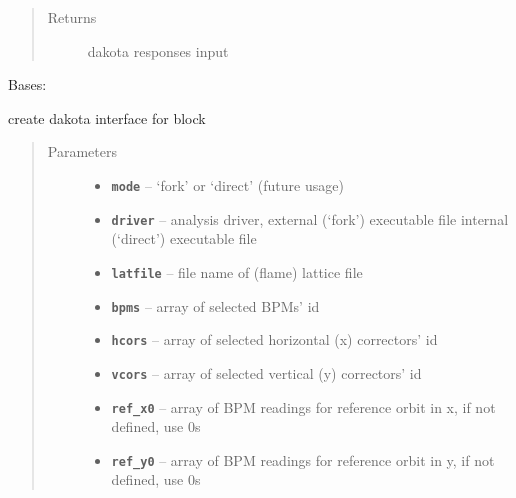 \documentclass[letterpaper,10pt,english]{sphinxmanual}
\begin{document}
\begin{fulllineitems}
\begin{fulllineitems}
\begin{quote}
\begin{description}
\item[{Returns}] \leavevmode
dakota responses input

\end{description}\end{quote}

\end{fulllineitems}


\end{fulllineitems}


\begin{fulllineitems}
\label{src/apidocs/genopt:genopt.DakotaInterface}
Bases: \href{https://docs.python.org/2/library/functions.html\#object}{}

create dakota interface for  block
\begin{quote}\begin{description}
\item[{Parameters}] \leavevmode\begin{itemize}
\item {} 
\textbf{\texttt{mode}} -- `fork' or `direct' (future usage)

\item {} 
\textbf{\texttt{driver}} -- analysis driver, external (`fork') executable file
internal (`direct') executable file

\item {} 
\textbf{\texttt{latfile}} -- file name of (flame) lattice file

\item {} 
\textbf{\texttt{bpms}} -- array of selected BPMs' id

\item {} 
\textbf{\texttt{hcors}} -- array of selected horizontal (x) correctors' id

\item {} 
\textbf{\texttt{vcors}} -- array of selected vertical (y) correctors' id

\item {} 
\textbf{\texttt{ref\_x0}} -- array of BPM readings for reference orbit in x, if not defined, use 0s

\item {} 
\textbf{\texttt{ref\_y0}} -- array of BPM readings for reference orbit in y, if not defined, use 0s


\end{itemize}
\end{description}
\end{quote}
\end{fulllineitems}
\end{document}
